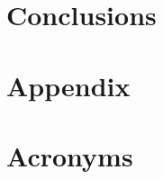\documentclass[spanish,english,12pt,letterpaper,oneside]{book}
\begin{document}
\chapter{Conclusions}
\label{conclusions}


\appendix
\chapter{Appendix}


\chapter{Acronyms}
\label{acronyms}





\backmatter



\end{document}
